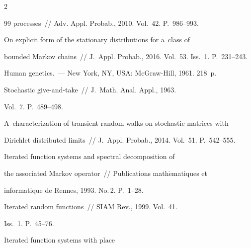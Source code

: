 \begin{multicols}{2}
{{\begin{thebibliography}{99}
processes~// Adv. Appl. Probab., 2010. Vol.~42. P.~986--993.




   On explicit form of the stationary distributions for a~class of 


bounded Markov chains~// J.~Appl. Probab., 2016. Vol.~53. Iss.~1. P.~231--243. 




   Human genetics.~--- New York, NY, USA: McGraw-Hill, 1961. 218~p.


 




   Stochastic give-and-take~// J.~Math. Anal. Appl., 1963. 


Vol.~7. P.~489--498.







   A~characterization of transient random walks on stochastic matrices with 


Dirichlet distributed limits~// J.~Appl. Probab., 2014. Vol.~51. P.~542--555.







   Iterated function systems and spectral decomposition of 


the associated Markov operator~// Publications math$\acute{\mbox{e}}$matiques et 


informatique de Rennes, 1993. No.\,2. P.~1--28.





\pagebreak







   Iterated random functions~// SIAM Rev., 1999. Vol.~41. 


Iss.~1. P.~45--76.













   Iterated function systems with place 



\end{thebibliography}}}
\end{multicols}
